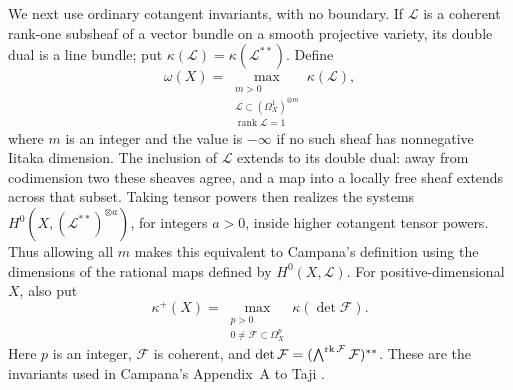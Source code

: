 We next use ordinary cotangent invariants, with no boundary. If
\(\mathcal L\) is a coherent rank-one subsheaf of a vector bundle on a
smooth projective variety, its double dual is a line bundle; put
\(\kappa(\mathcal L)=\kappa(\mathcal L^{**})\). Define
\[
 \omega(X)=
 \max_{\substack{m>0\\
 \mathcal L\subset(\Omega_X^1)^{\otimes m}\\
 \operatorname{rank}\mathcal L=1}}
 \kappa(\mathcal L),
\]
where \(m\) is an integer and the value is \(-\infty\) if no such sheaf
has nonnegative Iitaka dimension. The inclusion of \(\mathcal L\) extends
to its double dual: away from codimension two these sheaves agree, and a
map into a locally free sheaf extends across that subset. Taking tensor
powers then realizes the systems \(H^0(X,(\mathcal L^{**})^{\otimes a})\),
for integers \(a>0\), inside higher cotangent tensor powers. Thus allowing all \(m\) makes
this equivalent to Campana's definition using the dimensions of the
rational maps defined by \(H^0(X,\mathcal L)\). For positive-dimensional \(X\),
also put
\[
 \kappa^+(X)=
 \max_{\substack{p>0\\0\ne\mathcal F\subset\Omega_X^p}}
 \kappa(\det\mathcal F).
\]
Here \(p\) is an integer, \(\mathcal F\) is coherent, and
\(\det\mathcal F=(\bigwedge^{\operatorname{rk}\mathcal F}\mathcal F)^{**}\). These are the
invariants used in Campana's Appendix~A to Taji \cite{Taji2014}.

